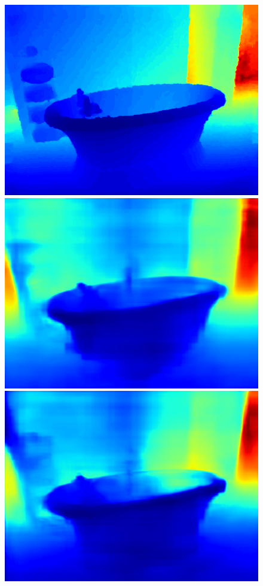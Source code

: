 \documentclass{svjour3}                     %
\begin{document}
\begin{figure}[t]
{\begin{minipage}[t]{0.15\linewidth}
  \includegraphics[width=1\linewidth]{images/nyu_gt/668.png}
  \includegraphics[width=1\linewidth]{images/nyu_result/bathroom_rgb_00668.png}
  \includegraphics[width=1\linewidth]{images/nyu_without/bathroom_rgb_00668.png}

\end{minipage}}
\end{figure}
\end{document}
